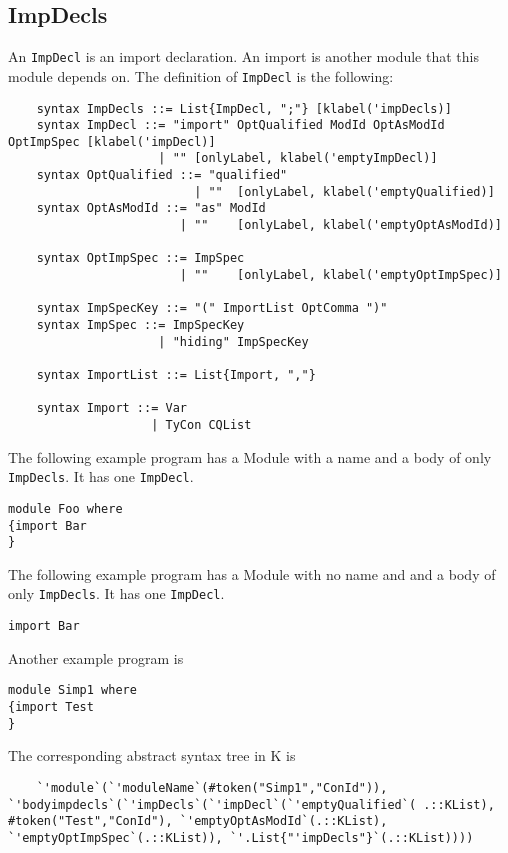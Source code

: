 \subsection{ImpDecls}
An \texttt{ImpDecl} is an import declaration. An import is another module that this module depends on.
The definition of \texttt{ImpDecl} is the following:
\begin{lstlisting}
    syntax ImpDecls ::= List{ImpDecl, ";"} [klabel('impDecls)]
    syntax ImpDecl ::= "import" OptQualified ModId OptAsModId OptImpSpec [klabel('impDecl)]
                     | "" [onlyLabel, klabel('emptyImpDecl)]
    syntax OptQualified ::= "qualified"
                          | ""  [onlyLabel, klabel('emptyQualified)]
    syntax OptAsModId ::= "as" ModId
                        | ""    [onlyLabel, klabel('emptyOptAsModId)]

    syntax OptImpSpec ::= ImpSpec
                        | ""    [onlyLabel, klabel('emptyOptImpSpec)]

    syntax ImpSpecKey ::= "(" ImportList OptComma ")"
    syntax ImpSpec ::= ImpSpecKey
                     | "hiding" ImpSpecKey

    syntax ImportList ::= List{Import, ","}

    syntax Import ::= Var
                    | TyCon CQList
\end{lstlisting}

\noindent
The following example program has a Module with a name and a body of only \texttt{ImpDecls}. It has one \texttt{ImpDecl}.

\begin{lstlisting}
module Foo where
{import Bar
}
\end{lstlisting}

\noindent
The following example program has a Module with no name and and a body of only \texttt{ImpDecls}. It has one \texttt{ImpDecl}.

\begin{lstlisting}
import Bar
\end{lstlisting}

\noindent
Another example program is
\begin{lstlisting}
module Simp1 where
{import Test
}
\end{lstlisting}

\noindent
The corresponding abstract syntax tree in K is
\begin{lstlisting}
	`'module`(`'moduleName`(#token("Simp1","ConId")), `'bodyimpdecls`(`'impDecls`(`'impDecl`(`'emptyQualified`( .::KList), #token("Test","ConId"), `'emptyOptAsModId`(.::KList), `'emptyOptImpSpec`(.::KList)), `'.List{"'impDecls"}`(.::KList))))
\end{lstlisting}

